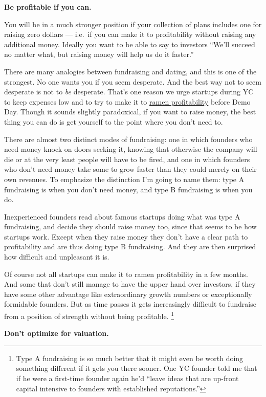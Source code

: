 \documentclass[12pt]{book}
\begin{document}
\textbf{Be profitable if you can.}

You will be in a much stronger position if your collection of plans
includes one for raising zero dollars --- i.e.~if you can make it to
profitability without raising any additional money. Ideally you want to
be able to say to investors ``We'll succeed no matter what, but raising
money will help us do it faster.''

There are many analogies between fundraising and dating, and this is one
of the strongest. No one wants you if you seem desperate. And the best
way not to seem desperate is not to \emph{be} desperate. That's one
reason we urge startups during YC to keep expenses low and to try to
make it to \href{ramenprofitable.html}{ramen profitability} before Demo
Day. Though it sounds slightly paradoxical, if you want to raise money,
the best thing you can do is get yourself to the point where you don't
need to.

There are almost two distinct modes of fundraising: one in which
founders who need money knock on doors seeking it, knowing that
otherwise the company will die or at the very least people will have to
be fired, and one in which founders who don't need money take some to
grow faster than they could merely on their own revenues. To emphasize
the distinction I'm going to name them: type A fundraising is when you
don't need money, and type B fundraising is when you do.

Inexperienced founders read about famous startups doing what was type A
fundraising, and decide they should raise money too, since that seems to
be how startups work. Except when they raise money they don't have a
clear path to profitability and are thus doing type B fundraising. And
they are then surprised how difficult and unpleasant it is.

Of course not all startups can make it to ramen profitability in a few
months. And some that don't still manage to have the upper hand over
investors, if they have some other advantage like extraordinary growth
numbers or exceptionally formidable founders. But as time passes it gets
increasingly difficult to fundraise from a position of strength without
being profitable. \footnote{Type A fundraising is so much better that it might even be
worth doing something different if it gets you there sooner. One YC
founder told me that if he were a first-time founder again he'd ``leave
ideas that are up-front capital intensive to founders with established
reputations.''}

\textbf{Don't optimize for valuation.}
\end{document}
